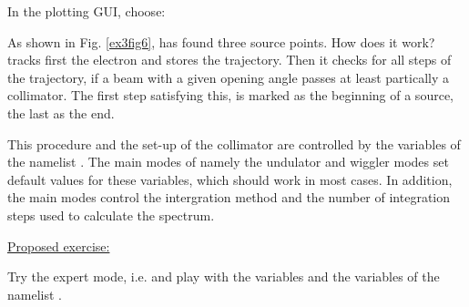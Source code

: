 In the plotting GUI, choose:


As shown in Fig. \ref{ex3fig6}, \W has found three source points. How
does it work? \W tracks first the electron and stores the trajectory.
Then it checks for all steps of the trajectory, if a beam with a given
opening angle passes at least partically a collimator.
The first step satisfying this, is marked as the beginning of a
source, the last as the end.


This procedure and the set-up of the collimator are controlled by the variables of the namelist
. The main modes of \W namely the undulator and
wiggler modes set default values for these variables, which
should work in most cases. In addition, the main modes control
the intergration method  and the number of integration steps
 used to calculate the
spectrum.

\underline{Proposed exercise:}

Try the expert mode, i.e.
and play with the variables
 and the variables of the namelist
.
